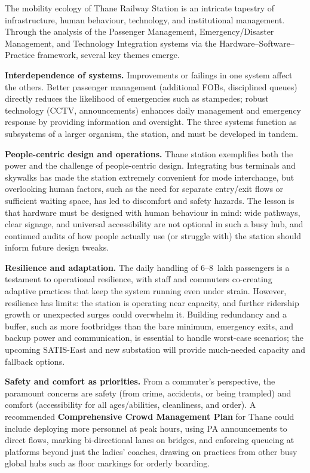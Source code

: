 \documentclass[11pt]{article}
\begin{document}
The mobility ecology of Thane Railway Station is an intricate tapestry of infrastructure, human
behaviour, technology, and institutional management. Through the analysis of the Passenger
Management, Emergency/Disaster Management, and Technology Integration systems via the
Hardware--Software--Practice framework, several key themes emerge.

\textbf{Interdependence of systems.} Improvements or failings in one system affect the others.
Better passenger management (additional FOBs, disciplined queues) directly reduces the
likelihood of emergencies such as stampedes; robust technology (CCTV, announcements) enhances
daily management and emergency response by providing information and oversight. The three
systems function as subsystems of a larger organism, the station, and must be developed in
tandem.

\textbf{People-centric design and operations.} Thane station exemplifies both the power and the
challenge of people-centric design. Integrating bus terminals and skywalks has made the station
extremely convenient for mode interchange, but overlooking human factors, such as the need for
separate entry/exit flows or sufficient waiting space, has led to discomfort and safety
hazards. The lesson is that hardware must be designed with human behaviour in mind: wide
pathways, clear signage, and universal accessibility are not optional in such a busy hub, and
continued audits of how people actually use (or struggle with) the station should inform future
design tweaks.

\textbf{Resilience and adaptation.} The daily handling of 6--8~lakh passengers is a testament to
operational resilience, with staff and commuters co-creating adaptive practices that keep the
system running even under strain. However, resilience has limits: the station is operating near
capacity, and further ridership growth or unexpected surges could overwhelm it. Building
redundancy and a buffer, such as more footbridges than the bare minimum, emergency exits, and
backup power and communication, is essential to handle worst-case scenarios; the upcoming SATIS-East and
new substation will provide much-needed capacity and fallback options.

\textbf{Safety and comfort as priorities.} From a commuter's perspective, the paramount concerns
are safety (from crime, accidents, or being trampled) and comfort (accessibility for all
ages/abilities, cleanliness, and order). A recommended \textbf{Comprehensive Crowd Management
Plan} for Thane could include deploying more personnel at peak hours, using PA announcements to
direct flows, marking bi-directional lanes on bridges, and enforcing queueing at platforms beyond
just the ladies' coaches, drawing on practices from other busy global hubs such as floor
markings for orderly boarding.
\end{document}
